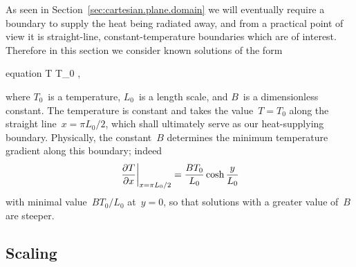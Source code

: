 As seen in Section~\ref{sec:cartesian.plane.domain}
we will eventually require a boundary to supply the heat being radiated away,
and from a practical point of view it is
straight-line, constant-temperature boundaries which are of interest.
Therefore in this section we consider known solutions of the form
\begin{important}{equation}
  T \ideq T_0 ,
  \label{eq:cosine-laplace-solution}
\end{important}
where $T_0$~is a temperature, $L_0$~is a length scale,
and $B$~is a dimensionless constant.
The temperature is constant and takes the value~$T = T_0$
along the straight line~$x = \pi L_0/2$,
which shall ultimately serve as our heat-supplying boundary.
Physically, the constant~$B$ determines
the minimum temperature gradient along this boundary;
indeed
\begin{equation}
  \eval*{\pder{T}{x}}_{x = \pi L_0/2} = \frac{B T_0}{L_0} \cosh\frac{y}{L_0}
  \label{eq:cosine-laplace-solution-dirichlet-slope}
\end{equation}
with minimal value~$B T_0 / L_0$ at~$y = 0$,
so that solutions with a greater value of~$B$ are steeper.

\subsection{Scaling}
\label{sec:cartesian.cosine.scaling}


